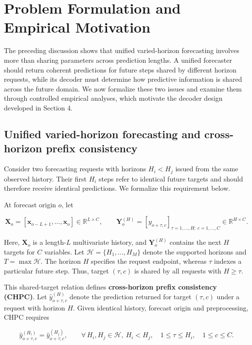 \documentclass[final,3p,times]{elsarticle}
\begin{document}
\section{Problem Formulation and Empirical Motivation}
\label{sec:problem-formulation}


The preceding discussion shows that unified varied-horizon forecasting involves more than sharing parameters across prediction lengths. A unified forecaster should return coherent predictions for future steps shared by different horizon requests, while its decoder must determine how predictive information is shared across the future domain. We now formalize these two issues and examine them through controlled empirical analyses, which motivate the decoder design developed in Section 4.

\subsection{Unified varied-horizon forecasting and cross-horizon prefix consistency}


Consider two forecasting requests with horizons $H_i<H_j$ issued from the same observed history. Their first $H_i$ steps refer to identical future targets and should therefore receive identical predictions. We formalize this requirement below.

At forecast origin $o$, let

\begin{equation}
\mathbf X_o
=
\left[\mathbf x_{o-L+1},\ldots,\mathbf x_o\right]
\in\mathbb R^{L\times C},
\qquad
\mathbf Y_o^{(H)}
=
\left[y_{o+\tau,c}\right]_{\tau=1,\ldots,H;\ c=1,\ldots,C}
\in\mathbb R^{H\times C}.
\end{equation}


Here, $\mathbf X_o$ is a length-$L$ multivariate history, and $\mathbf Y_o^{(H)}$ contains the next $H$ targets for $C$ variables. Let $\mathcal H=\{H_1,\ldots,H_M\}$ denote the supported horizons and $T=\max\mathcal H$. The horizon $H$ specifies the request endpoint, whereas $\tau$ indexes a particular future step. Thus, target $(\tau,c)$ is shared by all requests with $H\geq\tau$.

This shared-target relation defines \textbf{cross-horizon prefix consistency (CHPC)}. Let $\widehat y_{o+\tau,c}^{(H)}$ denote the prediction returned for target $(\tau,c)$ under a request with horizon $H$. Given identical history, forecast origin and preprocessing, CHPC requires

\begin{equation}
\widehat y_{o+\tau,c}^{(H_i)}
=
\widehat y_{o+\tau,c}^{(H_j)},
\qquad
\forall\,H_i,H_j\in\mathcal H,\ H_i<H_j,\quad
1\leq\tau\leq H_i,\quad
1\leq c\leq C.
\end{equation}
\end{document}
